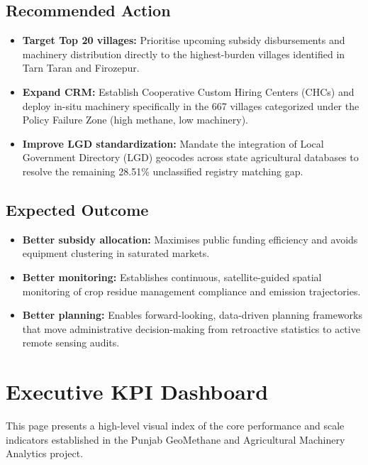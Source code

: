 \documentclass[12pt,a4paper]{report}
\begin{document}
\section*{Recommended Action}
\begin{itemize}
    \item \textbf{Target Top 20 villages:} Prioritise upcoming subsidy disbursements and machinery distribution directly to the highest-burden villages identified in Tarn Taran and Firozepur.
    \item \textbf{Expand CRM:} Establish Cooperative Custom Hiring Centers (CHCs) and deploy in-situ machinery specifically in the 667 villages categorized under the Policy Failure Zone (high methane, low machinery).
    \item \textbf{Improve LGD standardization:} Mandate the integration of Local Government Directory (LGD) geocodes across state agricultural databases to resolve the remaining 28.51\% unclassified registry matching gap.
\end{itemize}

\section*{Expected Outcome}
\begin{itemize}
    \item \textbf{Better subsidy allocation:} Maximises public funding efficiency and avoids equipment clustering in saturated markets.
    \item \textbf{Better monitoring:} Establishes continuous, satellite-guided spatial monitoring of crop residue management compliance and emission trajectories.
    \item \textbf{Better planning:} Enables forward-looking, data-driven planning frameworks that move administrative decision-making from retroactive statistics to active remote sensing audits.
\end{itemize}


\chapter*{Executive KPI Dashboard}
This page presents a high-level visual index of the core performance and scale indicators established in the Punjab GeoMethane and Agricultural Machinery Analytics project.
\end{document}

